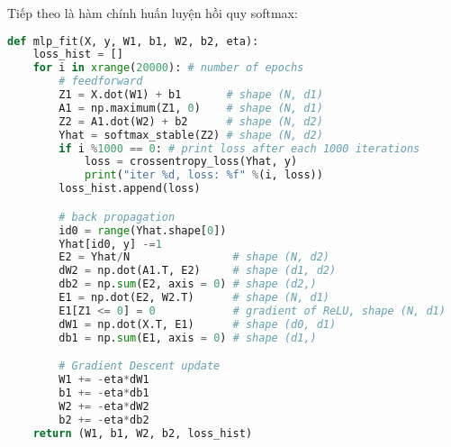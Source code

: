 Tiếp theo là hàm chính huấn luyện hồi quy softmax:
\begin{lstlisting}[language=Python]
def mlp_fit(X, y, W1, b1, W2, b2, eta):
    loss_hist = []
    for i in xrange(20000): # number of epochs
        # feedforward
        Z1 = X.dot(W1) + b1       # shape (N, d1)
        A1 = np.maximum(Z1, 0)    # shape (N, d1)
        Z2 = A1.dot(W2) + b2      # shape (N, d2)
        Yhat = softmax_stable(Z2) # shape (N, d2)
        if i %1000 == 0: # print loss after each 1000 iterations
            loss = crossentropy_loss(Yhat, y)
            print("iter %d, loss: %f" %(i, loss))
        loss_hist.append(loss)

        # back propagation
        id0 = range(Yhat.shape[0])
        Yhat[id0, y] -=1
        E2 = Yhat/N                # shape (N, d2)
        dW2 = np.dot(A1.T, E2)     # shape (d1, d2)
        db2 = np.sum(E2, axis = 0) # shape (d2,)
        E1 = np.dot(E2, W2.T)      # shape (N, d1)
        E1[Z1 <= 0] = 0            # gradient of ReLU, shape (N, d1)
        dW1 = np.dot(X.T, E1)      # shape (d0, d1)
        db1 = np.sum(E1, axis = 0) # shape (d1,)

        # Gradient Descent update
        W1 += -eta*dW1
        b1 += -eta*db1
        W2 += -eta*dW2
        b2 += -eta*db2
    return (W1, b1, W2, b2, loss_hist)
\end{lstlisting}

